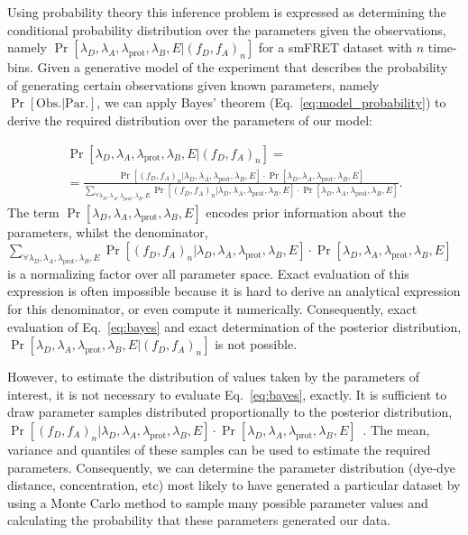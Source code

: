 Using probability theory this inference problem is expressed as determining the conditional probability distribution over the parameters given the observations, namely $\Pr[\lambda_D, \lambda_A, \lambda_{\text{prot}}, \lambda_B, E | (f_D, f_A)_n]$ for a smFRET dataset with $n$ time-bins. Given a generative model of the experiment that describes the probability of generating certain observations given known parameters, namely $\Pr[\text{Obs.} | \text{Par.}]$, we can apply Bayes' theorem (Eq.~\ref{eq:model_probability}) to derive the required distribution over the parameters of our model:

\begin{multline}
\Pr[\lambda_D, \lambda_A, \lambda_{\text{prot}}, \lambda_B, E | (f_D, f_A)_n] = \\ = \frac{\Pr[(f_D, f_A)_n |\lambda_D, \lambda_A, \lambda_{\text{prot}}, \lambda_B, E] \cdot \Pr[\lambda_D, \lambda_A, \lambda_{\text{prot}}, \lambda_B, E]}
{\sum_{\forall \lambda_D, \lambda_A, \lambda_{\text{prot}}, \lambda_B, E} \Pr[(f_D, f_A)_n | \lambda_D, \lambda_A, \lambda_{\text{prot}}, \lambda_B, E] \cdot \Pr[\lambda_D, \lambda_A, \lambda_{\text{prot}}, \lambda_B, E]}. 
\label{eq:bayes}
\end{multline}
The term $\Pr[\lambda_D, \lambda_A, \lambda_{\text{prot}}, \lambda_B, E]$ encodes prior information about the parameters, whilst the denominator, $\sum_{\forall \lambda_D, \lambda_A, \lambda_{\text{prot}}, \lambda_B, E} \Pr[(f_D, f_A)_n | \lambda_D, \lambda_A, \lambda_{\text{prot}}, \lambda_B, E] \cdot \Pr[\lambda_D, \lambda_A, \lambda_{\text{prot}}, \lambda_B, E]$ is a normalizing factor over all parameter space. Exact evaluation of this expression is often impossible because it is hard to derive an analytical expression for this denominator, or even compute it numerically. Consequently, exact evaluation of Eq.~\ref{eq:bayes} and exact determination of the posterior distribution, $\Pr[\lambda_D, \lambda_A, \lambda_{\text{prot}}, \lambda_B, E | (f_D, f_A)_n]$ is not possible.

However, to estimate the distribution of values taken by the parameters of interest, it is not necessary to evaluate Eq.~\ref{eq:bayes}, exactly. It is sufficient to draw parameter samples distributed proportionally to the posterior distribution, $\Pr[(f_D, f_A)_n |\lambda_D, \lambda_A, \lambda_{\text{prot}}, \lambda_B, E] \cdot \Pr[\lambda_D, \lambda_A, \lambda_{\text{prot}}, \lambda_B, E]$~\cite{hastings70}. The mean, variance and quantiles of these samples can be used to estimate the required parameters. Consequently, we can determine the parameter distribution (dye-dye distance, concentration, etc) most likely to have generated a particular dataset by using a Monte Carlo method to sample many possible parameter values and calculating the probability that these parameters generated our data.

